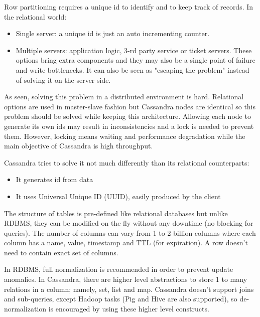 Row partitioning requires a unique id to identify and to keep track of records. In the relational world:
\begin{itemize}
  \item Single server: a unique id is just an auto incrementing counter.
  \item Multiple servers: application logic, 3-rd party service or ticket servers. These options bring extra components and they may also be a single point of failure and write bottlenecks. It can also be seen as "escaping the problem" instead of solving it on the server side.
\end{itemize}

As seen, solving this problem in a distributed environment is hard. Relational options are used in master-slave fashion but Cassandra nodes are identical so this problem should be solved while keeping this architecture. Allowing each node to generate its own ids may result in inconsistencies and a lock is needed to prevent them. However, locking means waiting and performance degradation while the main objective of Cassandra is high throughput.

Cassandra tries to solve it not much differently than its relational counterparts:
\begin{itemize}
  \item It generates id from data
  \item It uses Universal Unique ID (UUID)\cite{uuid}, easily produced by the client
\end{itemize}

The structure of tables is pre-defined like relational databases but unlike RDBMS, they can be modified on the fly without any downtime (no blocking for queries). The number of columns can vary from 1 to 2 billion columns where each column has a name, value, timestamp and TTL (for expiration). A row doesn't need to contain exact set of columns.

In RDBMS, full normalization is recommended in order to prevent update anomalies. In Cassandra, there are higher level abstractions to store 1 to many relations in a column; namely, set, list and map. Cassandra doesn't support joins and sub-queries, except Hadoop tasks (Pig and Hive are also supported), so de-normalization is encouraged by using these higher level constructs.

